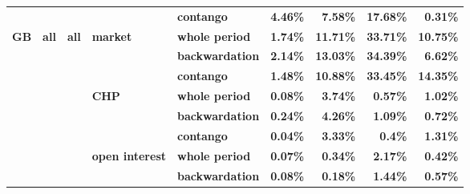\documentclass[
  authoryear,
  preprint,
  3p]{elsarticle}
\begin{document}
\begin{longtable}[t]{>{}l>{}l>{}l>{}l>{}l>{}r>{}r>{}r>{}r}
\textbf{} & \textbf{} & \textbf{} & \textbf{} & \textbf{contango} & \textcolor[HTML]{4285f4}{\textbf{4.46\%}} & \textcolor[HTML]{4285f4}{\textbf{7.58\%}} & \textcolor[HTML]{4285f4}{\textbf{17.68\%}} & \textcolor[HTML]{4285f4}{\textbf{0.31\%}}\\
\textbf{GB} & \textbf{all} & \textbf{all} & \textbf{market} & \textbf{whole period} & \textcolor[HTML]{4285f4}{\textbf{1.74\%}} & \textcolor[HTML]{4285f4}{\textbf{11.71\%}} & \textcolor[HTML]{4285f4}{\textbf{33.71\%}} & \textcolor[HTML]{4285f4}{\textbf{10.75\%}}\\
\addlinespace
\textbf{} & \textbf{} & \textbf{} & \textbf{} & \textbf{backwardation} & \textcolor[HTML]{4285f4}{\textbf{2.14\%}} & \textcolor[HTML]{4285f4}{\textbf{13.03\%}} & \textcolor[HTML]{4285f4}{\textbf{34.39\%}} & \textcolor[HTML]{4285f4}{\textbf{6.62\%}}\\
\textbf{} & \textbf{} & \textbf{} & \textbf{} & \textbf{contango} & \textcolor[HTML]{4285f4}{\textbf{1.48\%}} & \textcolor[HTML]{4285f4}{\textbf{10.88\%}} & \textcolor[HTML]{4285f4}{\textbf{33.45\%}} & \textcolor[HTML]{4285f4}{\textbf{14.35\%}}\\
\textbf{} & \textbf{} & \textbf{} & \textbf{CHP} & \textbf{whole period} & \textcolor[HTML]{4285f4}{\textbf{0.08\%}} & \textcolor[HTML]{4285f4}{\textbf{3.74\%}} & \textcolor[HTML]{4285f4}{\textbf{0.57\%}} & \textcolor[HTML]{4285f4}{\textbf{1.02\%}}\\
\textbf{} & \textbf{} & \textbf{} & \textbf{} & \textbf{backwardation} & \textcolor[HTML]{4285f4}{\textbf{0.24\%}} & \textcolor[HTML]{4285f4}{\textbf{4.26\%}} & \textcolor[HTML]{4285f4}{\textbf{1.09\%}} & \textcolor[HTML]{4285f4}{\textbf{0.72\%}}\\
\textbf{} & \textbf{} & \textbf{} & \textbf{} & \textbf{contango} & \textcolor[HTML]{4285f4}{\textbf{0.04\%}} & \textcolor[HTML]{4285f4}{\textbf{3.33\%}} & \textcolor[HTML]{4285f4}{\textbf{0.4\%}} & \textcolor[HTML]{4285f4}{\textbf{1.31\%}}\\
\addlinespace
\textbf{} & \textbf{} & \textbf{} & \textbf{open interest} & \textbf{whole period} & \textcolor[HTML]{4285f4}{\textbf{0.07\%}} & \textcolor[HTML]{4285f4}{\textbf{0.34\%}} & \textcolor[HTML]{4285f4}{\textbf{2.17\%}} & \textcolor[HTML]{4285f4}{\textbf{0.42\%}}\\
\textbf{} & \textbf{} & \textbf{} & \textbf{} & \textbf{backwardation} & \textcolor[HTML]{4285f4}{\textbf{0.08\%}} & \textcolor[HTML]{4285f4}{\textbf{0.18\%}} & \textcolor[HTML]{4285f4}{\textbf{1.44\%}} & \textcolor[HTML]{4285f4}{\textbf{0.57\%}}\\

\end{longtable}
\end{document}
